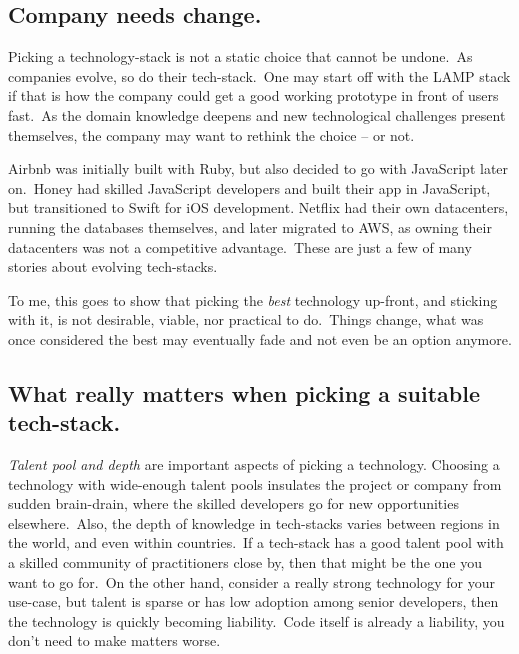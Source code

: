 \documentclass{article}
\begin{document}
    \subsection*{\normalfont\sffamily Company needs change.}
    Picking a technology-stack is not a static choice that cannot be undone.\ As companies evolve, so do their
    tech-stack.\ One may start off with the LAMP stack if that is how the company could get a good working prototype in
    front of users fast.\ As the domain knowledge deepens and new technological challenges
    present themselves, the company may want to rethink the choice – or not.

    Airbnb was initially built with Ruby, but also decided to go with JavaScript later on.\ Honey had skilled 
    JavaScript developers and built their app in JavaScript, but transitioned to Swift for iOS development.
    Netflix had their own datacenters, running the databases themselves, and later migrated to AWS, as owning their
    datacenters was not a competitive advantage.\ These are just a few of many stories about evolving tech-stacks.
    
    To me, this goes to show that picking the \textit{best} technology up-front, and sticking with it,
    is not desirable, viable, nor practical to do.\ Things change, what was once considered the best may eventually
    fade and not even be an option anymore.
    
    \subsection*{\normalfont\sffamily What really matters when picking a suitable tech-stack.}
    
    \textit{Talent pool and depth} are important aspects of picking a technology.
    Choosing a technology with wide-enough talent pools insulates the project or company from sudden brain-drain, 
    where the skilled developers go for new opportunities elsewhere.\ Also, the depth of knowledge in
    tech-stacks varies between regions in the world, and even within countries.\ If a tech-stack has a good talent pool
    with a skilled community of practitioners close by, then that might be the one you want to go for.\ On the other hand,
    consider a really strong technology for your use-case, but talent is sparse or has low adoption among senior developers,
    then the technology is quickly becoming liability.\ Code itself is already a liability, you don't need
    to make matters worse.
    
\end{document}
